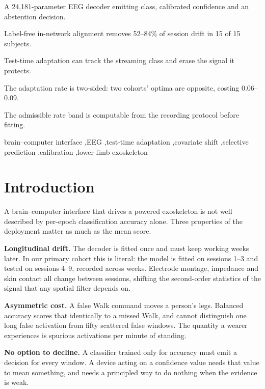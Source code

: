 \documentclass[preprint,12pt]{elsarticle}
\begin{document}
\begin{frontmatter}
\begin{highlights}
\item A 24{,}181-parameter EEG decoder emitting class, calibrated confidence and
      an abstention decision.
\item Label-free in-network alignment removes 52--84\% of session drift in 15 of
      15 subjects.
\item Test-time adaptation can track the streaming class and erase the signal it
      protects.
\item The adaptation rate is two-sided: two cohorts' optima are opposite, costing
      0.06--0.09.
\item The admissible rate band is computable from the recording protocol before
      fitting.
\end{highlights}

\begin{keyword}
brain--computer interface \sep EEG \sep test-time adaptation \sep covariate shift
\sep selective prediction \sep calibration \sep lower-limb exoskeleton
\end{keyword}

\end{frontmatter}

\section{Introduction}

A brain--computer interface that drives a powered exoskeleton is not well
described by per-epoch classification accuracy alone. Three properties of the
deployment matter as much as the mean score.

\textbf{Longitudinal drift.} The decoder is fitted once and must keep working
weeks later. In our primary cohort this is literal: the model is fitted on
sessions 1--3 and tested on sessions 4--9, recorded across weeks. Electrode
montage, impedance and skin contact all change between sessions, shifting the
second-order statistics of the signal that any spatial filter depends on.

\textbf{Asymmetric cost.} A false Walk command moves a person's legs. Balanced
accuracy scores that identically to a missed Walk, and cannot distinguish one
long false activation from fifty scattered false windows. The quantity a wearer
experiences is spurious activations per minute of standing.

\textbf{No option to decline.} A classifier trained only for accuracy must emit a
decision for every window. A device acting on a confidence value needs that value
to mean something, and needs a principled way to do nothing when the evidence is
weak.
\end{document}

